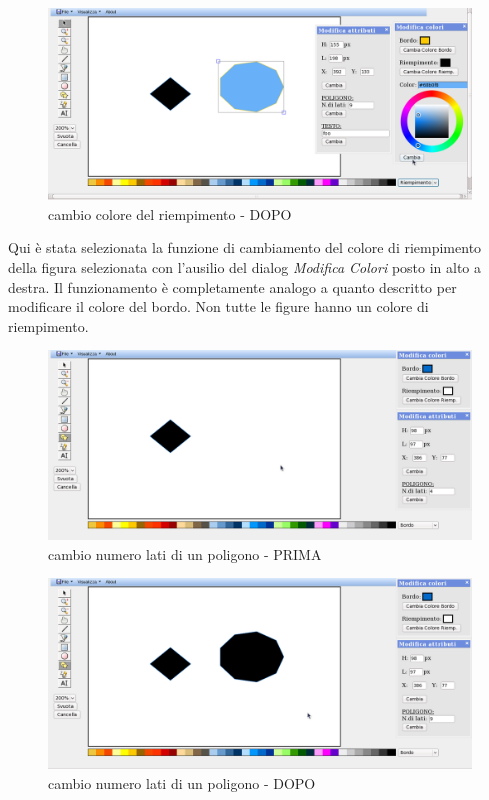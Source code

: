 \begin{figure}[!ht]
\centering
\includegraphics[scale=0.4]{images/colore_riempimento_dopo.png}
\caption{cambio colore del riempimento  - DOPO}
\end{figure} 


\vspace{100pt}
Qui \`e stata selezionata la funzione di cambiamento del colore di riempimento della figura selezionata con l'ausilio del dialog \textit{Modifica Colori} posto in alto a destra. Il funzionamento \`e completamente analogo a quanto descritto per modificare il colore del bordo. Non tutte le figure hanno un colore di riempimento.

\begin{figure}[!ht]
\centering
\includegraphics[scale=0.4]{images/numero_lati_prima.png}
\caption{cambio numero lati di un poligono  - PRIMA}
\end{figure} 

\begin{figure}[!ht]
\centering
\includegraphics[scale=0.4]{images/numero_lati_dopo.png}
\caption{cambio numero lati di un poligono  - DOPO}
\end{figure} 

